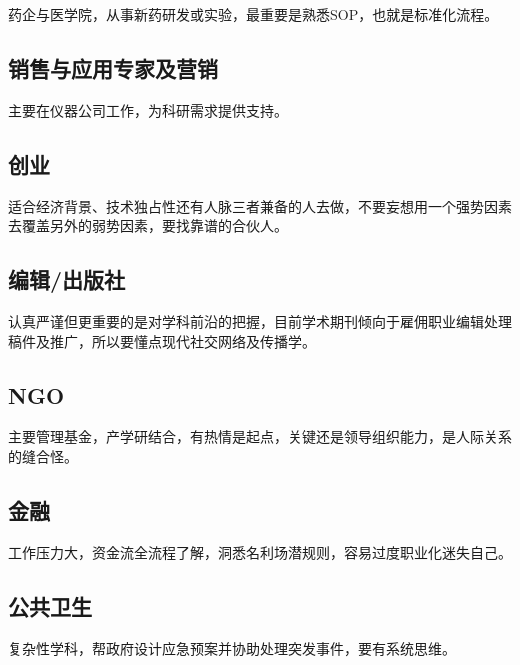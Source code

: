 \documentclass[]{tufte-book}
\begin{document}
药企与医学院，从事新药研发或实验，最重要是熟悉SOP，也就是标准化流程。

\hypertarget{ux9500ux552eux4e0eux5e94ux7528ux4e13ux5bb6ux53caux8425ux9500}{%
\subsection{销售与应用专家及营销}\label{ux9500ux552eux4e0eux5e94ux7528ux4e13ux5bb6ux53caux8425ux9500}}

主要在仪器公司工作，为科研需求提供支持。

\hypertarget{ux521bux4e1a}{%
\subsection{创业}\label{ux521bux4e1a}}

适合经济背景、技术独占性还有人脉三者兼备的人去做，不要妄想用一个强势因素去覆盖另外的弱势因素，要找靠谱的合伙人。

\hypertarget{ux7f16ux8f91ux51faux7248ux793e}{%
\subsection{编辑/出版社}\label{ux7f16ux8f91ux51faux7248ux793e}}

认真严谨但更重要的是对学科前沿的把握，目前学术期刊倾向于雇佣职业编辑处理稿件及推广，所以要懂点现代社交网络及传播学。

\hypertarget{ngo}{%
\subsection{NGO}\label{ngo}}

主要管理基金，产学研结合，有热情是起点，关键还是领导组织能力，是人际关系的缝合怪。

\hypertarget{ux91d1ux878d}{%
\subsection{金融}\label{ux91d1ux878d}}

工作压力大，资金流全流程了解，洞悉名利场潜规则，容易过度职业化迷失自己。

\hypertarget{ux516cux5171ux536bux751f}{%
\subsection{公共卫生}\label{ux516cux5171ux536bux751f}}

复杂性学科，帮政府设计应急预案并协助处理突发事件，要有系统思维。
\end{document}
